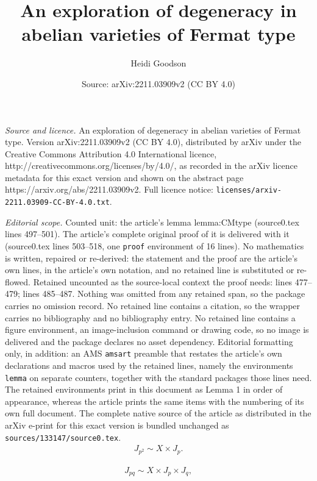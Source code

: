 \documentclass[10pt,a4paper]{amsart}
\title{An exploration of degeneracy in abelian varieties of Fermat type}
\author{Heidi Goodson}
\date{Source: arXiv:2211.03909v2 (CC BY 4.0)}
\begin{document}
\maketitle

\noindent\emph{Source and licence.} An exploration of degeneracy in abelian varieties of Fermat type. Version arXiv:2211.03909v2 (CC BY 4.0), distributed by arXiv under the Creative Commons Attribution 4.0 International licence, http://creativecommons.org/licenses/by/4.0/, as recorded in the arXiv licence metadata for this exact version and shown on the abstract page https://arxiv.org/abs/2211.03909v2. Full licence notice: \texttt{licenses/arxiv-2211.03909-CC-BY-4.0.txt}.\par\smallskip

\noindent\textit{Editorial scope.} Counted unit: the article's lemma lemma:CMtype (source0.tex lines 497--501). The article's complete original proof of it is delivered with it (source0.tex lines 503--518, one \texttt{proof} environment of 16 lines). No mathematics is written, repaired or re-derived: the statement and the proof are the article's own lines, in the article's own notation, and no retained line is substituted or re-flowed.  Retained uncounted as the source-local context the proof needs: lines 477--479; lines 485--487.  Nothing was omitted from any retained span, so the package carries no omission record.  No retained line contains a citation, so the wrapper carries no bibliography and no bibliography entry.  No retained line contains a figure environment, an image-inclusion command or drawing code, so no image is delivered and the package declares no asset dependency.  Editorial formatting only, in addition: an AMS \texttt{amsart} preamble that restates the article's own declarations and macros used by the retained lines, namely the environments \texttt{lemma} on separate counters, together with the standard packages those lines need.  The retained environments print in this document as Lemma 1 in order of appearance, whereas the article prints the same items with the numbering of its own full document.  The complete native source of the article as distributed in the arXiv e-print for this exact version is bundled unchanged as \texttt{sources/133147/source0.tex}.
\begin{align}\label{eqn:Jpp_splitting}
    J_{p^2}\sim X\times J_p.
\end{align}

\begin{align}\label{eqn:Jpq_splitting}
    J_{pq}\sim X\times J_p \times J_q,
\end{align}
\end{document}
